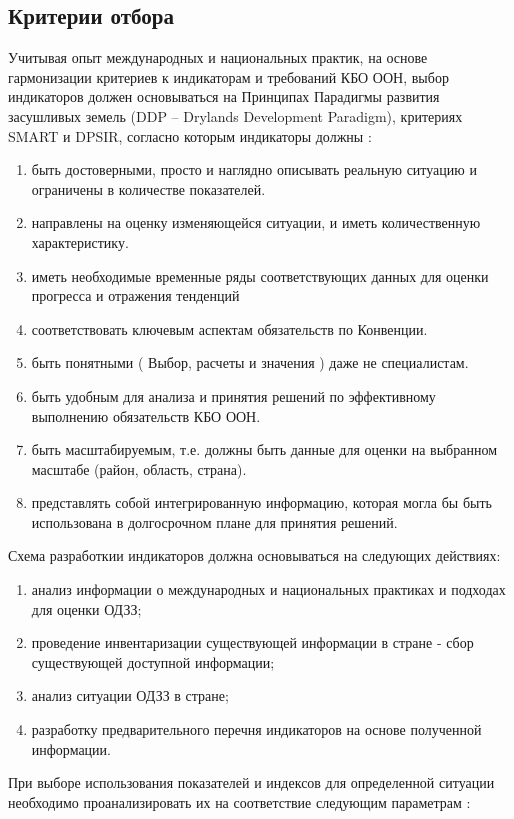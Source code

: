 \subsection{Критерии отбора}
Учитывая опыт международных и национальных практик, на основе гармонизации критериев к индикаторам и требований КБО ООН, выбор индикаторов должен основываться на Принципах Парадигмы развития засушливых земель (DDP – Drylands Development Paradigm), критериях SMART и DPSIR, согласно которым индикаторы должны \cite{Rakhmatova2017}: 

\begin{enumerate}
	\item быть достоверными, просто и наглядно описывать реальную ситуацию и ограничены в количестве показателей.
	\item направлены на оценку изменяющейся ситуации, и иметь количественную характеристику.
	\item иметь необходимые временные ряды соответствующих данных для оценки прогресса и отражения тенденций
	\item соответствовать ключевым аспектам обязательств по Конвенции.
	\item быть понятными ( Выбор, расчеты и значения ) даже не специалистам.
	\item быть удобным для анализа и принятия решений по эффективному выполнению обязательств КБО ООН.
	\item быть масштабируемым, т.е. должны быть данные для оценки на выбранном масштабе (район, область, страна).
	\item представлять собой интегрированную информацию, которая могла бы быть использована в долгосрочном плане для принятия решений.
\end{enumerate}

Схема разработкии индикаторов должна основываться на следующих действиях: 

\begin{enumerate}
	\item анализ информации о международных и национальных практиках и подходах для оценки ОДЗЗ;
	\item проведение инвентаризации существующей информации в стране - сбор существующей доступной информации;
	\item анализ ситуации ОДЗЗ в стране;
	\item разработку предварительного перечня индикаторов на основе полученной информации. 
\end{enumerate}

При выборе использования показателей и индексов для определенной ситуации необходимо проанализировать их на соответствие следующим параметрам \cite{Handbook2016}:

